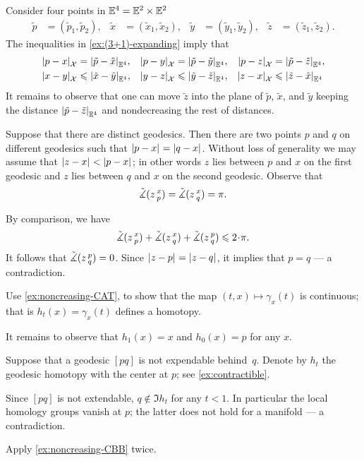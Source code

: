 Consider four points in $\mathbb{E}^4=\mathbb{E}^2\times\mathbb{E}^2$ 
\begin{align*}
\tilde p&=(\tilde p_1,\tilde p_2),
&
\tilde x&=(\tilde x_1,\tilde x_2),
&
\tilde y&=(\tilde y_1,\tilde y_2),
&
\tilde z&=(\tilde z_1,\tilde z_2).
\end{align*}
The inequalities in  \ref{ex:(3+1)-expanding} imply that
\begin{align*}
\dist{p}{x}{\spc{X}}&=\dist{\tilde p}{\tilde x}{\EE^4},
&
\dist{p}{y}{\spc{X}}&=\dist{\tilde p}{\tilde y}{\EE^4},
&
\dist{p}{z}{\spc{X}}&=\dist{\tilde p}{\tilde z}{\EE^4},
\\
\dist{x}{y}{\spc{X}}&\le\dist{\tilde x}{\tilde y}{\EE^4},
&
\dist{y}{z}{\spc{X}}&\le\dist{\tilde y}{\tilde z}{\EE^4},
&
\dist{z}{x}{\spc{X}}&\le\dist{\tilde z}{\tilde x}{\EE^4}
\end{align*}
It remains to observe that one can move $\tilde z$ into the plane of $\tilde p$, $\tilde x$, and $\tilde y$ keeping the distance $\dist{\tilde p}{\tilde z}{\EE^4}$ and nondecreasing the rest of distances. 

Suppose that there are distinct geodesics.
Then there are two points $p$ and $q$ on different geodesics such that $\dist{p}{x}{}=\dist{q}{x}{}$.
Without loss of generality we may assume that $\dist{z}{x}{}<\dist{p}{x}{}$;
in other words $z$ lies between $p$ and $x$ on the first geodesic and 
$z$ lies between $q$ and $x$ on the second geodesic.
Observe that 
\[\tilde\measuredangle(z\,{}^{x}_{p})=\tilde\measuredangle(z\,{}^{x}_{q})=\pi.\]

By comparison, we have
\[\angk zxp+\angk zxq+\angk zpq\le2\cdot\pi.\]
It follows that $\tilde\measuredangle(z\,{}^{p}_{q})=0$.
Since $\dist{z}{p}{}=\dist{z}{q}{}$, it implies that $p=q$ --- a contradiction.

Use \ref{ex:noncreasing-CAT}, to show that the map $(t,x)\mapsto \gamma_x(t)$ is continuous; that is $h_t(x)=\gamma_x(t)$ defines a homotopy.

It remains to observe that $h_1(x)=x$ and $h_0(x)=p$ for any $x$.

Suppose that a geodesic $[pq]$ is not expendable behind~$q$.
Denote by $h_t$ the geodesic homotopy with the center at $p$; see \ref{ex:contractible}.

Since $[pq]$ is not extendable, $q\notin \Im h_t$ for any $t<1$.
In particular the local homology groups vanish at $p$;
the latter does not hold for a manifold --- a contradiction.

Apply \ref{ex:noncreasing-CBB} twice.


